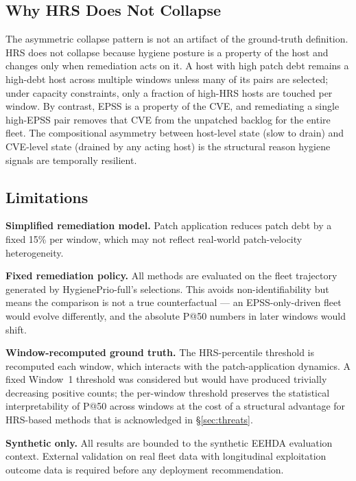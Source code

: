 \subsection{Why HRS Does Not Collapse}

The asymmetric collapse pattern is not an artifact of the ground-truth definition. HRS does not collapse because hygiene posture is a property of the host and changes only when remediation acts on it. A host with high patch debt remains a high-debt host across multiple windows unless many of its pairs are selected; under capacity constraints, only a fraction of high-HRS hosts are touched per window. By contrast, EPSS is a property of the CVE, and remediating a single high-EPSS pair removes that CVE from the unpatched backlog for the entire fleet. The compositional asymmetry between host-level state (slow to drain) and CVE-level state (drained by any acting host) is the structural reason hygiene signals are temporally resilient.

\subsection{Limitations}

\textbf{Simplified remediation model.} Patch application reduces patch debt by a fixed 15\% per window, which may not reflect real-world patch-velocity heterogeneity.

\textbf{Fixed remediation policy.} All methods are evaluated on the fleet trajectory generated by HygienePrio-full's selections. This avoids non-identifiability but means the comparison is not a true counterfactual --- an EPSS-only-driven fleet would evolve differently, and the absolute P@50 numbers in later windows would shift.

\textbf{Window-recomputed ground truth.} The HRS-percentile threshold is recomputed each window, which interacts with the patch-application dynamics. A fixed Window~1 threshold was considered but would have produced trivially decreasing positive counts; the per-window threshold preserves the statistical interpretability of P@50 across windows at the cost of a structural advantage for HRS-based methods that is acknowledged in \S\ref{sec:threats}.

\textbf{Synthetic only.} All results are bounded to the synthetic EEHDA evaluation context. External validation on real fleet data with longitudinal exploitation outcome data is required before any deployment recommendation.
